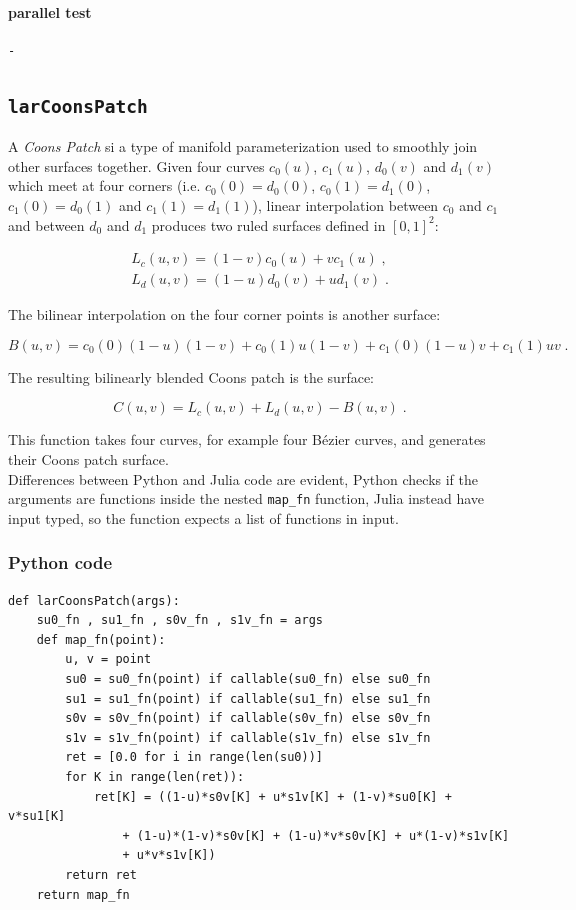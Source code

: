 \documentclass[a4paper,11pt]{article}
\begin{document}
\paragraph{parallel test}
\begin{verbatim}
-
\end{verbatim}


\subsection{\texttt{larCoonsPatch}}

A \emph{Coons Patch} si a type of manifold parameterization used to smoothly join other surfaces together. Given four curves $c_0(u)$, $c_1(u)$, $d_0(v)$ and $d_1(v)$ which meet at four corners (i.e. $c_0(0)=d_0(0)$, $c_0(1)=d_1(0)$, $c_1(0)=d_0(1)$ and $c_1(1)=d_1(1)$), linear interpolation between $c_0$ and $c_1$ and between $d_0$ and $d_1$ produces two ruled surfaces defined in $[0,1]^2$:

\begin{align*}
L_c(u,v)=(1-v)c_0(u)+vc_1(u) \;,  \\
L_d(u,v)=(1-u)d_0(v)+ud_1(v)\;.
\end{align*}

The bilinear interpolation on the four corner points is another surface:

\begin{equation*}
B(u,v)=c_0(0)(1-u)(1-v)+c_0(1)u(1-v)+c_1(0)(1-u)v+c_1(1)uv \;.
\end{equation*}

The resulting bilinearly blended Coons patch is the surface:

\begin{equation*}
C(u,v)=L_c(u,v)+L_d(u,v)-B(u,v) \; .
\end{equation*}

This function takes four curves, for example four B\'ezier curves, and generates their Coons patch surface. \\
Differences between Python and Julia code are evident, Python checks if the arguments are functions inside the nested \texttt{map\_fn} function, Julia instead have input typed, so the function expects a list of functions in input.

\subsubsection{Python code}

\begin{verbatim}
def larCoonsPatch(args): 
    su0_fn , su1_fn , s0v_fn , s1v_fn = args
    def map_fn(point):
        u, v = point
        su0 = su0_fn(point) if callable(su0_fn) else su0_fn
        su1 = su1_fn(point) if callable(su1_fn) else su1_fn
        s0v = s0v_fn(point) if callable(s0v_fn) else s0v_fn
        s1v = s1v_fn(point) if callable(s1v_fn) else s1v_fn
        ret = [0.0 for i in range(len(su0))]
        for K in range(len(ret)):
            ret[K] = ((1-u)*s0v[K] + u*s1v[K] + (1-v)*su0[K] + v*su1[K] 
                + (1-u)*(1-v)*s0v[K] + (1-u)*v*s0v[K] + u*(1-v)*s1v[K] 
                + u*v*s1v[K])
        return ret
    return map_fn
\end{verbatim}
\end{document}
